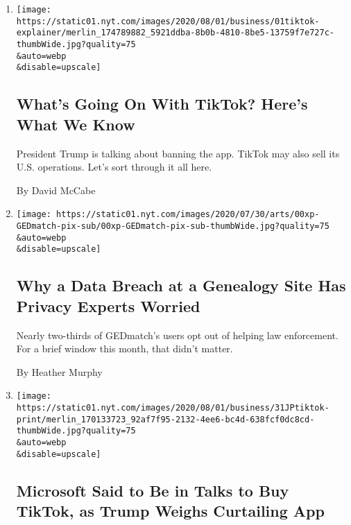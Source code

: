 \begin{enumerate}
\def\labelenumi{\arabic{enumi}.}
\item
  \href{/2020/08/01/technology/tiktok-trump-microsoft-bytedance-china-ban.html}{}

  \texttt{[image: https://static01.nyt.com/images/2020/08/01/business/01tiktok-explainer/merlin\_174789882\_5921ddba-8b0b-4810-8be5-13759f7e727c-thumbWide.jpg?quality=75\\\&auto=webp\\\&disable=upscale]}

  \hypertarget{whats-going-on-with-tiktok-heres-what-we-know}{%
  \subsection{What's Going On With TikTok? Here's What We
  Know}\label{whats-going-on-with-tiktok-heres-what-we-know}}

  President Trump is talking about banning the app. TikTok may also sell
  its U.S. operations. Let's sort through it all here.

  By David McCabe
\item
  \href{/2020/08/01/technology/gedmatch-breach-privacy.html}{}

  \texttt{[image: https://static01.nyt.com/images/2020/07/30/arts/00xp-GEDmatch-pix-sub/00xp-GEDmatch-pix-sub-thumbWide.jpg?quality=75\\\&auto=webp\\\&disable=upscale]}

  \hypertarget{why-a-data-breach-at-a-genealogy-site-has-privacy-experts-worried}{%
  \subsection{Why a Data Breach at a Genealogy Site Has Privacy Experts
  Worried}\label{why-a-data-breach-at-a-genealogy-site-has-privacy-experts-worried}}

  Nearly two-thirds of GEDmatch's users opt out of helping law
  enforcement. For a brief window this month, that didn't matter.

  By Heather Murphy
\item
  \href{/2020/07/31/technology/tiktok-microsoft.html}{}

  \texttt{[image: https://static01.nyt.com/images/2020/08/01/business/31JPtiktok-print/merlin\_170133723\_92af7f95-2132-4ee6-bc4d-638fcf0dc8cd-thumbWide.jpg?quality=75\\\&auto=webp\\\&disable=upscale]}

  \hypertarget{microsoft-said-to-be-in-talks-to-buy-tiktok-as-trump-weighs-curtailing-app}{%
  \subsection{Microsoft Said to Be in Talks to Buy TikTok, as Trump
  Weighs Curtailing
  App}\label{microsoft-said-to-be-in-talks-to-buy-tiktok-as-trump-weighs-curtailing-app}}


\end{enumerate}
